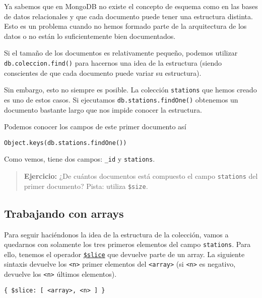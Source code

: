 \documentclass[]{article}
\begin{document}
Ya sabemos que en MongoDB no existe el concepto de esquema como en las
bases de datos relacionales y que cada documento puede tener una
estructura distinta. Esto es un problema cuando no hemos formado parte
de la arquitectura de los datos o no están lo suficientemente bien
documentados.

Si el tamaño de los documentos es relativamente pequeño, podemos
utilizar \texttt{db.coleccion.find()} para hacernos una idea de la
estructura (siendo conscientes de que cada documento puede variar su
estructura).

Sin embargo, esto no siempre es posible. La colección \texttt{stations}
que hemos creado es uno de estos casos. Si ejecutamos
\texttt{db.stations.findOne()} obtenemos un documento bastante largo que
nos impide conocer la estructura.

Podemos conocer los campos de este primer documento así

\begin{verbatim}
Object.keys(db.stations.findOne())
\end{verbatim}

Como vemos, tiene dos campos: \texttt{\_id} y \texttt{stations}.

\begin{quote}
\textbf{Ejercicio:} ¿De cuántos documentos está compuesto el campo
\texttt{stations} del primer documento? Pista: utiliza \texttt{\$size}.
\end{quote}

\hypertarget{trabajando-con-arrays}{%
\subsection{Trabajando con arrays}\label{trabajando-con-arrays}}

Para seguir haciéndonos la idea de la estructura de la colección, vamos
a quedarnos con solamente los tres primeros elementos del campo
\texttt{stations}. Para ello, tenemos el operador
\href{https://docs.mongodb.com/manual/reference/operator/aggregation/slice/}{\texttt{\$slice}}
que devuelve parte de un array. La siguiente sintaxis devuelve los
\texttt{\textless{}n\textgreater{}} primer elementos del
\texttt{\textless{}array\textgreater{}} (si
\texttt{\textless{}n\textgreater{}} es negativo, devuelve los
\texttt{\textless{}n\textgreater{}} últimos elementos).

\begin{verbatim}
{ $slice: [ <array>, <n> ] }
\end{verbatim}
\end{document}
